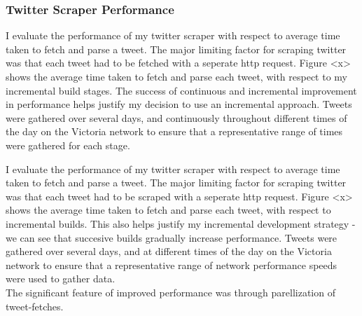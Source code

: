 \subsubsection{Twitter Scraper Performance}
I evaluate the performance of my twitter scraper with respect to average time taken to fetch and parse a tweet. The major limiting factor for scraping twitter was that each tweet had to be fetched with a seperate http request. Figure <x> shows the average time taken to fetch and parse each tweet, with respect to my incremental build stages. The success of continuous and incremental improvement in performance helps justify my decision to use an incremental approach. Tweets were gathered over several days, and continuously throughout different times of the day on the Victoria network to ensure that a representative range of times were gathered for each stage. 


I evaluate the performance of my twitter scraper with respect to average time taken to fetch and parse a tweet. The major limiting factor for scraping twitter was that each tweet had to be scraped with a seperate http request. Figure <x> shows the average time taken to fetch and parse each tweet, with respect to incremental builds. This also helps justify my incremental development strategy - we can see that succesive builds gradually increase performance. Tweets were gathered over several days, and at different times of the day on the Victoria network to ensure that a representative range of network performance speeds were used to gather data.\\

\noindent The significant feature of improved performance was through parellization of tweet-fetches. 

